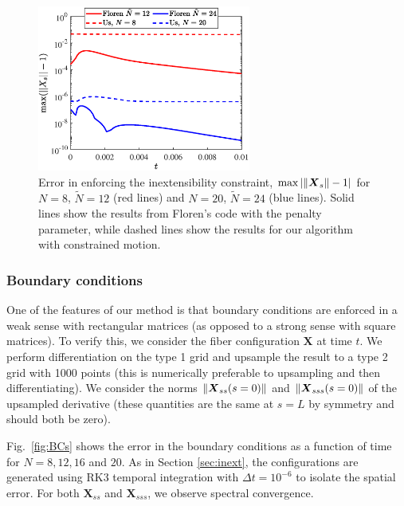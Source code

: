 \begin{figure}
\centering
\includegraphics[width=70mm]{Local/Inextensibility.eps}
\caption{Error in enforcing the inextensibility constraint, $\textrm{max}\left|\left\Vert \boldsymbol{X}_s\right\Vert-1\right|$ for $N=8$, $\tilde{N}=12$ (red lines) and $N=20$, $\tilde{N}=24$ (blue lines). Solid lines show the results from Floren's code with the penalty parameter, while dashed lines show the results for our algorithm with constrained motion. }
\label{fig:inext}
\end{figure}

\subsubsection{Boundary conditions}
One of the features of our method is that boundary conditions are enforced in a weak sense with rectangular matrices (as opposed to a strong sense with square matrices). To verify this, we consider the fiber configuration $\bm{X}$ at time $t$. We perform differentiation on the type 1 grid and upsample the result to a type 2 grid with 1000 points (this is numerically preferable to upsampling and then differentiating). We consider the norms $\left\Vert \boldsymbol{X}_{ss}(s=0)\right\Vert$ and $\left\Vert \boldsymbol{X}_{sss}(s=0)\right\Vert$ of the upsampled derivative (these quantities are the same at $s=L$ by symmetry and should both be zero). 

Fig.\ \ref{fig:BCs} shows the error in the boundary conditions as a function of time for $N=8, 12, 16$ and $20$. As in Section \ref{sec:inext}, the configurations are generated using RK3 temporal integration with $\Delta t =10^{-6}$ to isolate the spatial error. For both $\bm{X}_{ss}$ and $\bm{X}_{sss}$, we observe spectral convergence. 

